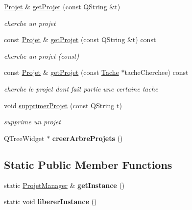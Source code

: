 \begin{DoxyCompactItemize}
\item 
\hyperlink{class_projet}{Projet} \& \hyperlink{class_projet_manager_a71f8824b361c273c30c14986d3a641db}{get\+Projet} (const Q\+String \&t)
\begin{DoxyCompactList}\small\item\em cherche un projet \end{DoxyCompactList}\item 
const \hyperlink{class_projet}{Projet} \& \hyperlink{class_projet_manager_a900b7454a6f57b6a239162c33f066b0b}{get\+Projet} (const Q\+String \&t) const 
\begin{DoxyCompactList}\small\item\em cherche un projet (const) \end{DoxyCompactList}\item 
const \hyperlink{class_projet}{Projet} \& \hyperlink{class_projet_manager_a1118bd68adead7ff90830384e392c947}{get\+Projet} (const \hyperlink{class_tache}{Tache} $\ast$tache\+Cherchee) const 
\begin{DoxyCompactList}\small\item\em cherche le projet dont fait partie une certaine tache \end{DoxyCompactList}\item 
void \hyperlink{class_projet_manager_a67cd6f8a8e91786cfc6102f2839401e5}{supprimer\+Projet} (const Q\+String t)
\begin{DoxyCompactList}\small\item\em supprime un projet \end{DoxyCompactList}\item 
\hypertarget{class_projet_manager_a057f1a7825e4756b3f4ea9b1b5f8a54c}{}Q\+Tree\+Widget $\ast$ {\bfseries creer\+Arbre\+Projets} ()\label{class_projet_manager_a057f1a7825e4756b3f4ea9b1b5f8a54c}

\end{DoxyCompactItemize}
\subsection*{Static Public Member Functions}
\begin{DoxyCompactItemize}
\item 
\hypertarget{class_projet_manager_af0b8d536c3d208289033d6a3b757fac9}{}static \hyperlink{class_projet_manager}{Projet\+Manager} \& {\bfseries get\+Instance} ()\label{class_projet_manager_af0b8d536c3d208289033d6a3b757fac9}

\item 
\hypertarget{class_projet_manager_ab1b9396cdda866051d03ac5eae7f7e9d}{}static void {\bfseries liberer\+Instance} ()\label{class_projet_manager_ab1b9396cdda866051d03ac5eae7f7e9d}

\end{DoxyCompactItemize}
